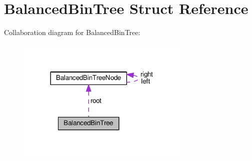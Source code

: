 \hypertarget{structBalancedBinTree}{}\section{Balanced\+Bin\+Tree Struct Reference}
\label{structBalancedBinTree}


Collaboration diagram for Balanced\+Bin\+Tree\+:
\nopagebreak
\begin{figure}[H]
\begin{center}
\leavevmode
\includegraphics[width=234pt]{structBalancedBinTree__coll__graph}
\end{center}
\end{figure}
